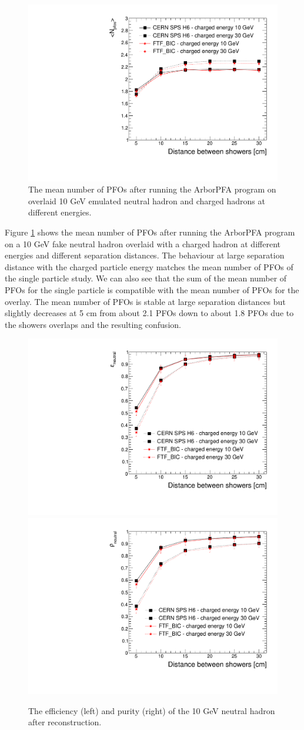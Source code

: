 \documentclass[cits]{JINST}
\begin{document}
\begin{figure}[!h]
  \begin{center}
    \includegraphics[width=0.6\linewidth]{plots/OverlayEvent/OverlayEvent_NPfos.pdf}
  \end{center}
  \caption{\label{OVERLAY_EVENT_NPFOS} The mean number of PFOs after running the ArborPFA program on overlaid 10 GeV emulated neutral hadron and charged hadrons at different energies.}
\end{figure}


Figure \ref{OVERLAY_EVENT_NPFOS} shows the mean number of PFOs after running the ArborPFA program on a 10 GeV fake neutral hadron overlaid with a charged hadron at different energies and different separation distances. The behaviour at large separation distance with the charged particle energy matches the mean number of PFOs of the single particle study. We can also see that the sum of the mean number of PFOs for the single particle is compatible with the mean number of PFOs for the overlay. The mean number of PFOs is stable at large separation distances but slightly decreases at 5 cm from about 2.1 PFOs down to about 1.8 PFOs due to the showers overlaps and the resulting confusion.

\begin{figure}[!h]
  \begin{center}
    \includegraphics[width=0.47\linewidth]{plots/OverlayEvent/OverlayEvent_Efficiency.pdf}
    \includegraphics[width=0.47\linewidth]{plots/OverlayEvent/OverlayEvent_Purity.pdf}
  \end{center}
  \caption{\label{OVERLAY_EVENT_PURITY_EFFICIENCY} The efficiency (left) and purity (right) of the 10 GeV neutral hadron after reconstruction.}
\end{figure}
\end{document}
